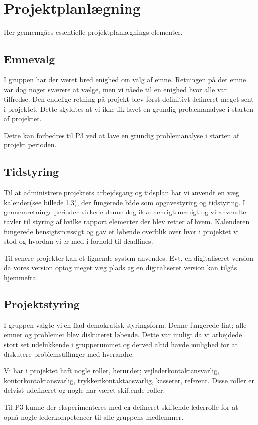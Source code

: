 \section{Projektplanl\ae{}gning}
Her gennemg\aa{}es essentielle projektplanl\ae{}gnings elementer. 
\subsection{Emnevalg}
I gruppen har der v\ae{}ret bred enighed om valg af emne. Retningen p\aa{} det emne var dog noget sv\ae{}rere at v\ae{}lge, men vi n\aa{}ede til en enighed hvor alle var tilfredse. 
Den endelige retning p\aa{} projekt blev f\o{}rst definitivt defineret meget sent i projektet.
Dette skyldtes at vi ikke fik lavet en grundig problemanalyse i starten af projektet.

Dette kan forbedres til P3 ved at lave en grundig problemanalyse i starten af projekt perioden. 

\subsection{Tidstyring}
Til at administrere projektets arbejdsgang og tidsplan har vi anvendt en v\ae{}g kalender(see billede \ref{}), der fungerede b\aa{}de som opgavestyring og tidstyring. 
I gennemretnings perioder virkede denne dog ikke hensigtsm\ae{}sigt og vi anvendte tavler til styring af hvilke rapport elementer der blev retter af hvem. 
Kalenderen fungerede hensigtsm\ae{}ssigt og gav et l\o{}bende overblik over hvor i projektet vi stod og hvordan vi er med i forhold til deadlines. 

Til senere projekter kan et lignende system anvendes. Evt. en digitaliseret version da vores version optog meget v\ae{}g plads og en digitaliseret version kan tilg\aa{}s hjemmefra. 

\subsection{Projektstyring}
I gruppen valgte vi en flad demokratisk styringsform. Denne fungerede fint; alle emner og problemer blev diskuteret l\o{}bende. Dette var muligt da vi arbejdede stort set udelukkende i grupperummet og derved altid havde mulighed for at diskutere problemstillinger med hverandre. 

Vi har i projektet haft nogle roller, herunder; vejlederkontaktansvarlig, kontorkontaktansvarlig, trykkerikontaktansvarlig, kasserer, referent. Disse roller er delvist udefineret og nogle har v\ae{}ret skiftende roller.

Til P3 kunne der eksperimenteres med en defineret skiftende lederrolle for at opn\aa{} nogle lederkompetencer til alle gruppens medlemmer. 






